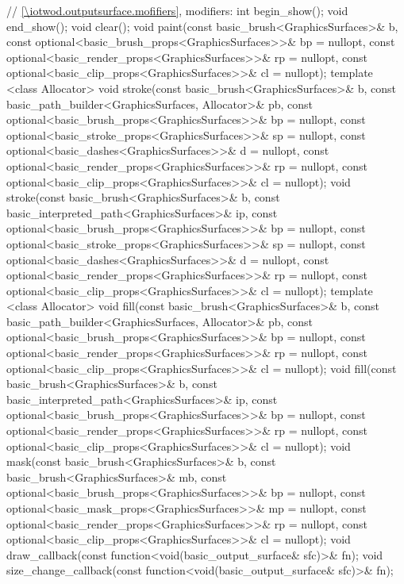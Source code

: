 \begin{codeblock}
{{    // \ref{\iotwod.outputsurface.mofifiers}, modifiers:
    int begin_show();
    void end_show();
    void clear();
    void paint(const basic_brush<GraphicsSurfaces>& b,
      const optional<basic_brush_props<GraphicsSurfaces>>& bp = nullopt,
      const optional<basic_render_props<GraphicsSurfaces>>& rp = nullopt,
      const optional<basic_clip_props<GraphicsSurfaces>>& cl = nullopt);
    template <class Allocator>
    void stroke(const basic_brush<GraphicsSurfaces>& b,
      const basic_path_builder<GraphicsSurfaces, Allocator>& pb,
      const optional<basic_brush_props<GraphicsSurfaces>>& bp = nullopt,
      const optional<basic_stroke_props<GraphicsSurfaces>>& sp = nullopt,
      const optional<basic_dashes<GraphicsSurfaces>>& d = nullopt,
      const optional<basic_render_props<GraphicsSurfaces>>& rp = nullopt,
      const optional<basic_clip_props<GraphicsSurfaces>>& cl = nullopt);
    void stroke(const basic_brush<GraphicsSurfaces>& b,
      const basic_interpreted_path<GraphicsSurfaces>& ip,
      const optional<basic_brush_props<GraphicsSurfaces>>& bp = nullopt,
      const optional<basic_stroke_props<GraphicsSurfaces>>& sp = nullopt,
      const optional<basic_dashes<GraphicsSurfaces>>& d = nullopt,
      const optional<basic_render_props<GraphicsSurfaces>>& rp = nullopt,
      const optional<basic_clip_props<GraphicsSurfaces>>& cl = nullopt);
    template <class Allocator>
    void fill(const basic_brush<GraphicsSurfaces>& b,
      const basic_path_builder<GraphicsSurfaces, Allocator>& pb,
      const optional<basic_brush_props<GraphicsSurfaces>>& bp = nullopt,
      const optional<basic_render_props<GraphicsSurfaces>>& rp = nullopt,
      const optional<basic_clip_props<GraphicsSurfaces>>& cl = nullopt);
    void fill(const basic_brush<GraphicsSurfaces>& b,
      const basic_interpreted_path<GraphicsSurfaces>& ip,
      const optional<basic_brush_props<GraphicsSurfaces>>& bp = nullopt,
      const optional<basic_render_props<GraphicsSurfaces>>& rp = nullopt,
      const optional<basic_clip_props<GraphicsSurfaces>>& cl = nullopt);
    void mask(const basic_brush<GraphicsSurfaces>& b,
      const basic_brush<GraphicsSurfaces>& mb,
      const optional<basic_brush_props<GraphicsSurfaces>>& bp = nullopt,
      const optional<basic_mask_props<GraphicsSurfaces>>& mp = nullopt,
      const optional<basic_render_props<GraphicsSurfaces>>& rp = nullopt,
      const optional<basic_clip_props<GraphicsSurfaces>>& cl = nullopt);
    void draw_callback(const function<void(basic_output_surface& sfc)>& fn);
    void size_change_callback(const function<void(basic_output_surface& sfc)>& fn);
}}
\end{codeblock}
